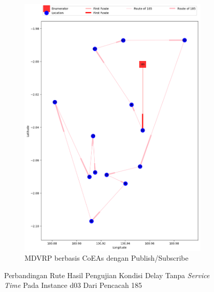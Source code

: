 \begin{figure}[H]\ContinuedFloat
	\centering
	\begin{subfigure}[t]{\textwidth}
		\centering
		\includegraphics[width=\textwidth]{Resources/Images/delayed_3/real_m15_n100_delayed_3_185_pubsub_coes}
		\caption{MDVRP berbasis CoEAs dengan Publish/Subscribe}
		\label{fig:real_m15_n100_delayed_3_185_pubsub_coes}
	\end{subfigure}
	\caption{Perbandingan Rute Hasil Pengujian Kondisi Delay Tanpa \textit{Service Time} Pada Instance d03 Dari Pencacah 185}
	\label{fig:real_m15_n100_delayed_3_185_contd}
\end{figure}


